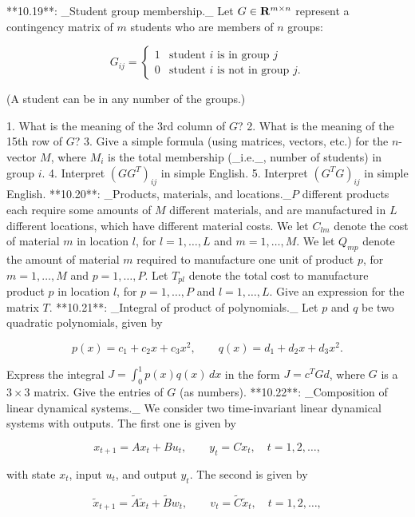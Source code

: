 

**10.19**: _Student group membership._ Let \(G\in{\bf R}^{m\times n}\) represent a contingency matrix of \(m\) students who are members of \(n\) groups:

\[G_{ij}=\left\{\begin{array}{ll}1&\mbox{student $i$ is in group $j$}\\ 0&\mbox{student $i$ is not in group $j$.}\end{array}\right.\]

(A student can be in any number of the groups.)

1. What is the meaning of the 3rd column of \(G\)?
2. What is the meaning of the 15th row of \(G\)?
3. Give a simple formula (using matrices, vectors, etc.) for the \(n\)-vector \(M\), where \(M_{i}\) is the total membership (_i.e._, number of students) in group \(i\).
4. Interpret \((GG^{T})_{ij}\) in simple English.
5. Interpret \((G^{T}G)_{ij}\) in simple English.
**10.20**: _Products, materials, and locations._\(P\) different products each require some amounts of \(M\) different materials, and are manufactured in \(L\) different locations, which have different material costs. We let \(C_{lm}\) denote the cost of material \(m\) in location \(l\), for \(l=1,\ldots,L\) and \(m=1,\ldots,M\). We let \(Q_{mp}\) denote the amount of material \(m\) required to manufacture one unit of product \(p\), for \(m=1,\ldots,M\) and \(p=1,\ldots,P\). Let \(T_{pl}\) denote the total cost to manufacture product \(p\) in location \(l\), for \(p=1,\ldots,P\) and \(l=1,\ldots,L\). Give an expression for the matrix \(T\).
**10.21**: _Integral of product of polynomials._ Let \(p\) and \(q\) be two quadratic polynomials, given by

\[p(x)=c_{1}+c_{2}x+c_{3}x^{2},\qquad q(x)=d_{1}+d_{2}x+d_{3}x^{2}.\]

Express the integral \(J=\int_{0}^{1}p(x)q(x)\,dx\) in the form \(J=c^{T}Gd\), where \(G\) is a \(3\times 3\) matrix. Give the entries of \(G\) (as numbers).
**10.22**: _Composition of linear dynamical systems._ We consider two time-invariant linear dynamical systems with outputs. The first one is given by

\[x_{t+1}=Ax_{t}+Bu_{t},\qquad y_{t}=Cx_{t},\quad t=1,2,\ldots,\]

with state \(x_{t}\), input \(u_{t}\), and output \(y_{t}\). The second is given by

\[\tilde{x}_{t+1}=\tilde{A}\tilde{x}_{t}+\tilde{B}w_{t},\qquad v_{t}=\tilde{C} \tilde{x}_{t},\quad t=1,2,\ldots,\]

